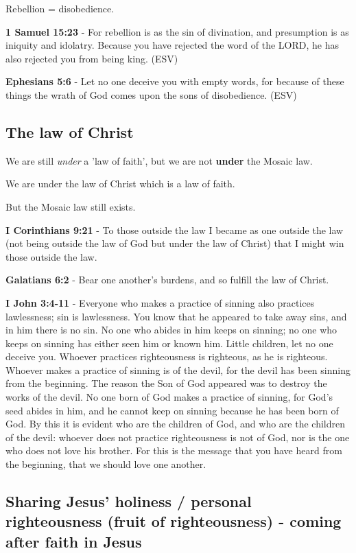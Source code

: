 \documentclass[11pt]{article}
\begin{document}
Rebellion = disobedience.

\textbf{1 Samuel 15:23} - For rebellion is as the sin of divination, and presumption is as iniquity and idolatry. Because you have rejected the word of the LORD, he has also rejected you from being king. (ESV)

\textbf{Ephesians 5:6} - Let no one deceive you with empty words, for because of these things the wrath of God comes upon the sons of disobedience. (ESV)

\subsection{The law of Christ}
\label{sec:orgd1e7f69}
We are still \emph{under} a 'law of faith', but we are not \textbf{under} the Mosaic law.

We are under the law of Christ which is a law of faith.

But the Mosaic law still exists.

\textbf{I Corinthians 9:21} - To those outside the law I became as one outside the law (not being outside the law of God but under the law of Christ) that I might win those outside the law.

\textbf{Galatians 6:2} - Bear one another's burdens, and so fulfill the law of Christ.

\textbf{I John 3:4-11} - Everyone who makes a practice of sinning also practices lawlessness; sin is lawlessness. You know that he appeared to take away sins, and in him there is no sin. No one who abides in him keeps on sinning; no one who keeps on sinning has either seen him or known him. Little children, let no one deceive you. Whoever practices righteousness is righteous, as he is righteous. Whoever makes a practice of sinning is of the devil, for the devil has been sinning from the beginning. The reason the Son of God appeared was to destroy the works of the devil. No one born of God makes a practice of sinning, for God's seed abides in him, and he cannot keep on sinning because he has been born of God. By this it is evident who are the children of God, and who are the children of the devil: whoever does not practice righteousness is not of God, nor is the one who does not love his brother. For this is the message that you have heard from the beginning, that we should love one another.

\subsection{Sharing Jesus' holiness / personal righteousness (fruit of righteousness) - coming \textbf{after} faith in Jesus}
\label{sec:org31d2dca}
\end{document}

